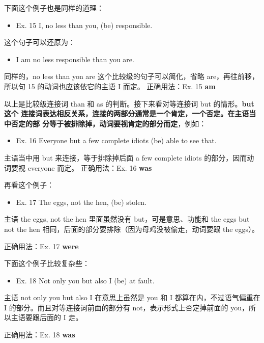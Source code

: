 \documentclass{yufa}
\begin{document}
下面这个例子也是同样的道理：
\begin{mybox}

  \begin{itemize}
  \item   Ex. 15 I, no less than you, (be) responsible.
  \end{itemize}
  这个句子可以还原为：
  \begin{itemize}
  \item   I am no less responsible than you are.
  \end{itemize}
  同样的，no less than yon are 这个比较级的句子可以简化，省略
  are，再往前移，所以句 15 的动词也应该依它的主语 I 而定。
  \tcblower
  正确用法：Ex. 15 \textbf{am}
\end{mybox}

以上是比较级连接词 than 和 as 的判断。接下来看对等连接词 but 的情形。\textbf{but这个
  连接词表达相反关系，连接的两部分通常是一个肯定，一个否定。在主语当中否定的部
  分等于被排除掉，动词要视肯定的部分而定}，例如：
\begin{mybox}
  \begin{itemize}
  \item   Ex. 16 Everyone but a few complete idiots (be) able to see that.
  \end{itemize}

  主语当中用 but 来连接，等于排除掉后面 a few complete idiots
  的部分，因而动词要视 everyone 而定。
  \tcblower
  正确用法：Ex. 16 \textbf{was}
\end{mybox}

再看这个例子：
\begin{mybox}
  \begin{itemize}
  \item   Ex. 17 The eggs, not the hen, (be) stolen.
  \end{itemize}

  主语 the eggs, not the hen 里面虽然没有 but，可是意思、功能和 the eggs but
  not the hen 相同，后面的部分要排除（因为母鸡没被偷走，动词要跟 the
  eggs）。

  \tcblower

  正确用法：Ex. 17 \textbf{were}
\end{mybox}

下面这个例子比较复杂些：
\begin{mybox}

  \begin{itemize}
  \item   Ex. 18 Not only you but also I (be) at fault.
  \end{itemize}

  主语 not only you but also I 在意思上虽然是 you 和 I
  都算在内，不过语气偏重在 I 的部分。而且对等连接词前面的部分有
  not，表示形式上否定掉前面的 you，所以主语要跟后面的 I 走。

  \tcblower

  正确用法：Ex. 18 \textbf{was}
\end{mybox}
\end{document}
